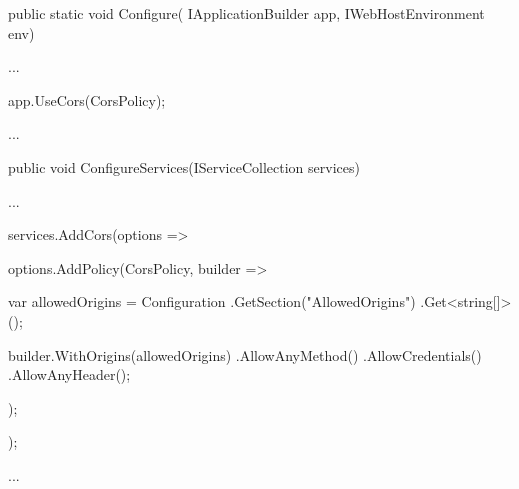 \begin{spverbatim}
    public static void Configure(
    IApplicationBuilder app,
    IWebHostEnvironment env)
    {
        ...

        app.UseCors(CorsPolicy);

        ...
    }

    public void ConfigureServices(IServiceCollection services)
    {
        ...

        services.AddCors(options =>
        {
            options.AddPolicy(CorsPolicy, builder =>
            {
                var allowedOrigins = Configuration
                        .GetSection("AllowedOrigins")
                        .Get<string[]>();

                builder.WithOrigins(allowedOrigins)
                       .AllowAnyMethod()
                       .AllowCredentials()
                       .AllowAnyHeader();
            });
        });

        ...
    }

\end{spverbatim}